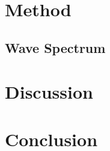 \documentclass[a4paper,fleqn]{cas-sc}
\begin{document}
\subsection{}



\section{Method}\label{method}


\subsection{Wave Spectrum}\label{introspec}




\section{Discussion}\label{disc}


\section{Conclusion}\label{con}







\end{document}
